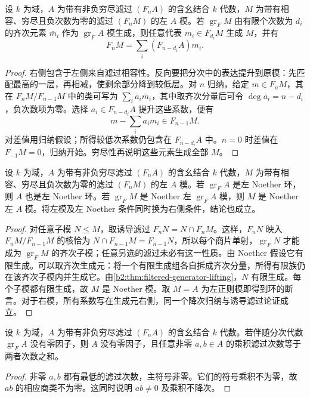 \begin{theorem}\label{b2:thm:filtered-generator-lifting}
	设 \(k\) 为域，\(A\) 为带有非负穷尽滤过 \((F_nA)\) 的含幺结合 \(k\) 代数，\(M\) 为带有相容、穷尽且负次数为零的滤过 \((F_nM)\) 的左 \(A\) 模。若 \(\operatorname{gr}_F M\) 由有限个次数为 \(d_i\) 的齐次元素 \(\bar m_i\) 作为 \(\operatorname{gr}_F A\) 模生成，则任意代表 \(m_i\in F_{d_i}M\) 生成 \(M\)，并有
	\[
		F_nM=\sum_i(F_{n-d_i}A)m_i.
	\]
\end{theorem}
\begin{proof}
	右侧包含于左侧来自滤过相容性。反向要把分次中的表达提升到原模：先匹配最高的一层，再相减，使剩余部分降到较低层。对 \(n\) 归纳，给定 \(m\in F_nM\)，其在 \(F_nM/F_{n-1}M\) 中的类可写为 \(\sum_i\bar a_i\bar m_i\)，其中取齐次分量后可令 \(\deg\bar a_i=n-d_i\)，负次数项为零。选择 \(a_i\in F_{n-d_i}A\) 提升这些系数，便有
	\[
		m-\sum_i a_im_i\in F_{n-1}M.
	\]
	对差值用归纳假设；所得较低次系数仍包含在 \(F_{n-d_i}A\) 中。\(n=0\) 时差值在 \(F_{-1}M=0\)，归纳开始。穷尽性再说明这些元素生成全部 \(M\)。
\end{proof}

\begin{theorem}\label{b2:thm:filtered-noetherian-transfer}
	设 \(k\) 为域，\(A\) 为带有非负穷尽滤过 \((F_nA)\) 的含幺结合 \(k\) 代数，\(M\) 为带有相容、穷尽且负次数为零的滤过 \((F_nM)\) 的左 \(A\) 模。若 \(\operatorname{gr}_F A\) 是左 Noether 环，则 \(A\) 也是左 Noether 环。若 \(\operatorname{gr}_F M\) 是 Noether 左 \(\operatorname{gr}_F A\) 模，则 \(M\) 是 Noether 左 \(A\) 模。将左模及左 Noether 条件同时换为右侧条件，结论也成立。
\end{theorem}
\begin{proof}
	对任意子模 \(N\le M\)，取诱导滤过 \(F_nN=N\cap F_nM\)。这样，\(F_nN\) 映入 \(F_nM/F_{n-1}M\) 的核恰为 \(N\cap F_{n-1}M=F_{n-1}N\)，所以每个商片单射，\(\operatorname{gr}_F N\) 才能成为 \(\operatorname{gr}_F M\) 的齐次子模；任意另选的滤过未必有这一性质。由 Noether 假设它有限生成。可以取齐次生成元：将一个有限生成组各自拆成齐次分量，所得有限族仍在该齐次子模内并生成它。由\cref{b2:thm:filtered-generator-lifting}，\(N\) 有限生成。每个子模都有限生成，故 \(M\) 是 Noether 模。取 \(M=A\) 为左正则模即得到环的断言。对于右模，所有系数写在生成元右侧，同一个降次归纳与诱导滤过论证成立。
\end{proof}

\begin{proposition}\label{b2:prop:filtered-domain}
	设 \(k\) 为域，\(A\) 为带有非负穷尽滤过 \((F_nA)\) 的含幺结合 \(k\) 代数。若伴随分次代数 \(\operatorname{gr}_F A\) 没有零因子，则 \(A\) 没有零因子，且任意非零 \(a,b\in A\) 的乘积滤过次数等于两者次数之和。
\end{proposition}
\begin{proof}
	非零 \(a,b\) 都有最低的滤过次数，主符号非零。它们的符号乘积不为零，故 \(ab\) 的相应商类不为零。这同时说明 \(ab\ne0\) 及乘积不降次。
\end{proof}

